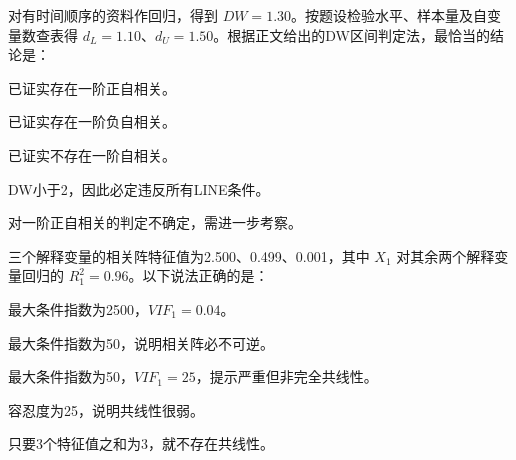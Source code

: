 \par\addvspace{6pt}\noindent\begin{minipage}{\linewidth}


对有时间顺序的资料作回归，得到 \(DW=1.30\)。按题设检验水平、样本量及自变量数查表得 \(d_L=1.10\)、\(d_U=1.50\)。根据正文给出的DW区间判定法，最恰当的结论是：


\begin{choices}

\item 已证实存在一阶正自相关。

\item 已证实存在一阶负自相关。

\item 已证实不存在一阶自相关。

\item DW小于2，因此必定违反所有LINE条件。

\item 对一阶正自相关的判定不确定，需进一步考察。

\end{choices}

\end{minipage}\par\vspace{4pt}

\par\addvspace{6pt}\noindent\begin{minipage}{\linewidth}


三个解释变量的相关阵特征值为2.500、0.499、0.001，其中 \(X_1\) 对其余两个解释变量回归的 \(R_1^2=0.96\)。以下说法正确的是：


\begin{choices}

\item 最大条件指数为2500，\(VIF_1=0.04\)。

\item 最大条件指数为50，说明相关阵必不可逆。

\item 最大条件指数为50，\(VIF_1=25\)，提示严重但非完全共线性。

\item 容忍度为25，说明共线性很弱。

\item 只要3个特征值之和为3，就不存在共线性。

\end{choices}

\end{minipage}\par\vspace{4pt}

